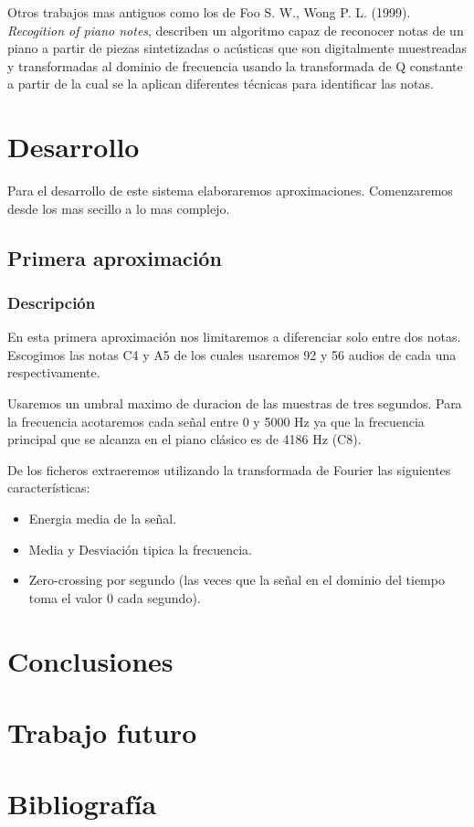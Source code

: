\documentclass[12pt]{article}
\begin{document}
\bigskip
Otros trabajos mas antiguos como los de Foo S. W., Wong P. L. (1999). \textit{Recogition of piano notes}, describen un algoritmo capaz de reconocer notas
de un piano a partir de piezas sintetizadas o acústicas que son digitalmente muestreadas y transformadas al dominio de frecuencia usando 
la transformada de Q constante a partir de la cual se la aplican diferentes técnicas para identificar las notas.

\section{Desarrollo}
\label{Desarrollo}
Para el desarrollo de este sistema elaboraremos aproximaciones. Comenzaremos desde los mas secillo a lo mas complejo.
\subsection{Primera aproximación}
\label{Primera aproximación}

\subsubsection{Descripción}
En esta primera aproximación nos limitaremos a diferenciar solo entre dos notas. 
Escogimos las notas C4 y A5 de los cuales usaremos 92 y 56 audios de cada una respectivamente.

Usaremos un umbral maximo de duracion de las muestras de tres segundos. Para la frecuencia acotaremos 
cada señal entre 0 y 5000 Hz ya que la frecuencia principal que se alcanza en el piano clásico es de 4186 Hz (C8).

De los ficheros extraeremos utilizando la transformada de Fourier las siguientes características: 

\begin{itemize}
	\item Energia media de la señal.
	\item Media y Desviación tipica la frecuencia.
	\item Zero-crossing por segundo (las veces que la señal en el dominio del tiempo toma el valor 0 cada segundo).
\end{itemize}

\section{Conclusiones}
\label{Conclusiones}

\section{Trabajo futuro}
\label{Trabajo futuro}

\section{Bibliografía}
\label{Bibliografía}
\end{document}
